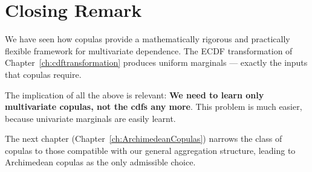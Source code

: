 \section{Closing Remark}
We have seen how copulas provide a mathematically rigorous and practically flexible framework for multivariate dependence. The ECDF transformation of Chapter~\ref{ch:cdftransformation} produces uniform marginals — exactly the inputs that copulas require.

The implication of all the above is relevant: \textbf{We need to learn only multivariate copulas, not the cdfs any more}. This problem is much easier, because univariate marginals are easily learnt.

The next chapter (Chapter~\ref{ch:ArchimedeanCopulas}) narrows the class of copulas to those compatible with our general aggregation structure, leading to Archimedean copulas as the only admissible choice.



